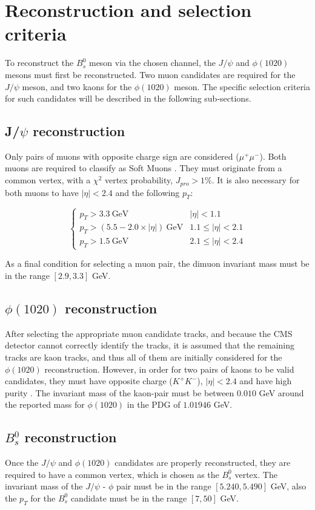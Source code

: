\section{Reconstruction and selection criteria}%
To reconstruct the $B^0_s$ meson via the chosen channel, the $J/\psi$ and $\phi (1020)$ mesons must first be reconstructed. Two muon candidates are required for the $J/\psi$ meson, and two kaons for the $\phi (1020)$ meson. The specific selection criteria for such candidates will be described in the following sub-sections.
\subsection{J/$\psi$ reconstruction}

Only pairs of muons with opposite charge sign are considered ($\mu^{+}\mu^{-}$). Both muons are required to classify as Soft Muons \cite{sirunyan2018performance}. They must originate from a common vertex, with a  $\chi^2$ vertex probability, $J_{pro} > 1\%$. It is also necessary for both muons to have $|\eta| < 2.4$ and the following $p_T$:

\[ \begin{cases} 
	p_T > 3.3 \ \text{GeV} & |\eta| < 1.1 \\
	p_T > \left(5.5 - 2.0 \times |\eta|\right) \ \text{GeV} & 1.1 \leq |\eta| < 2.1 \\
	p_T > 1.5 \ \text{GeV} & 2.1 \leq |\eta| < 2.4 
\end{cases}
\] 

As a final condition for selecting a muon pair, the dimuon invariant mass must be in the range $[2.9, 3.3]$ GeV.
\subsection{$\phi(1020)$ reconstruction}
After selecting the appropriate muon candidate tracks, and because the CMS detector cannot correctly identify the tracks, it is assumed that the remaining tracks are kaon tracks, and thus all of them are initially considered for the $\phi(1020)$ reconstruction. However, in order for two pairs of kaons to be valid candidates, they must have opposite charge ($K^{+}K^{-}$), $|\eta| < 2.4$ and have high purity \cite{cms2014description}. The invariant mass of the kaon-pair must be between $0.010$ GeV around the reported mass for $\phi(1020)$ in the PDG of $1.01946$ GeV.
\subsection{$B_s^0$ reconstruction}
Once the $J/\psi$ and $\phi(1020)$ candidates are properly reconstructed, they are required to have a common vertex, which is chosen as the $B^0_s$ vertex. The invariant mass of the $J/\psi$ - $\phi$ pair must be in the range $[5.240, 5.490]$ GeV, also the $p_T$ for the $B_s^0$ candidate must be in the range $[7, 50]$ GeV. 

